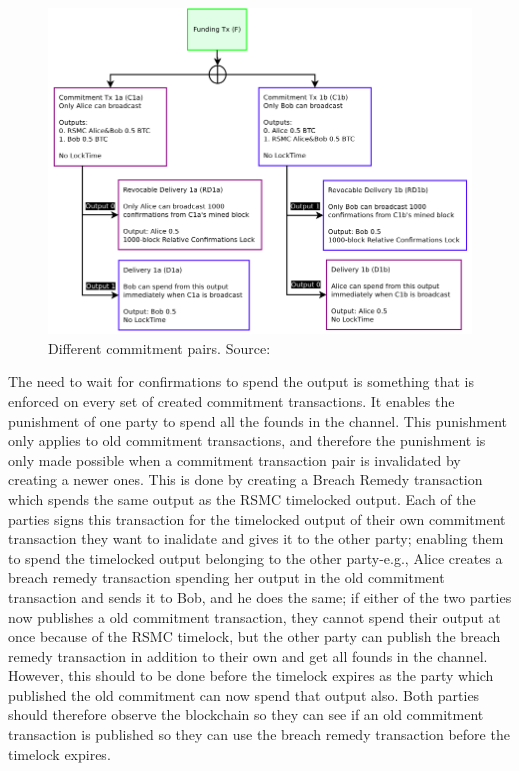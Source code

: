 \begin{figure}[h]
    \centering
    \includegraphics[width=12cm]{figures/ln_timeout.png}
    \caption{Different commitment pairs. Source: \cite{poon2015bitcoin}}
    \label{fig:ln_timeout}
\end{figure}

The need to wait for confirmations to spend the output is something that is enforced on every set of created commitment transactions. It enables the punishment of one party to spend all the founds in the channel. This punishment only applies to old commitment transactions, and therefore the punishment is only made possible when a commitment transaction pair is invalidated by creating a newer ones. This is done by creating a Breach Remedy transaction which spends the same output as the RSMC timelocked output. Each of the parties signs this transaction for the timelocked output of their own commitment transaction they want to inalidate and gives it to the other party; enabling them to spend the timelocked output belonging to the other party-e.g., Alice creates a breach remedy transaction spending her output in the old commitment transaction and sends it to Bob, and he does the same; if either of the two parties now publishes a old commitment transaction, they cannot spend their output at once because of the RSMC timelock, but the other party can publish the breach remedy transaction in addition to their own and get all founds in the channel. However, this should to be done before the timelock expires as the party which published the old commitment can now spend that output also. Both parties should therefore observe the blockchain so they can see if an old commitment transaction is published so they can use the breach remedy transaction before the timelock expires.
\\

